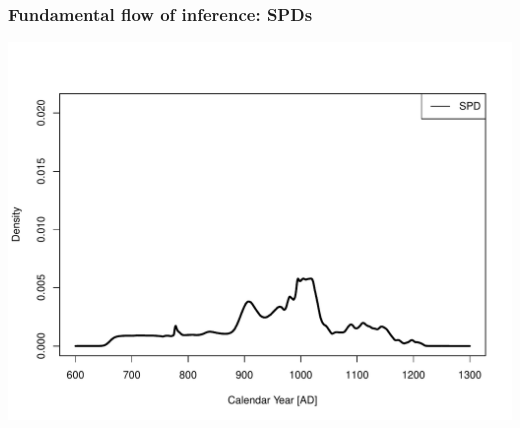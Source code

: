 \documentclass{beamer}
\begin{document}
\begin{frame}[t]
  \frametitle{Fundamental flow of inference: SPDs}
    \includegraphics[height=.85\textheight]{sim_spd_10000.pdf}
\end{frame}

\end{document}
